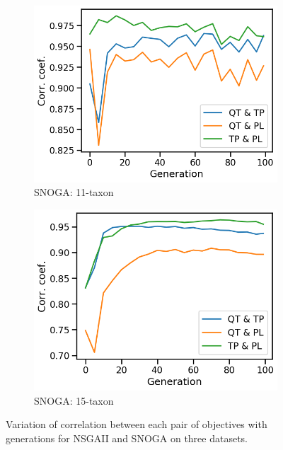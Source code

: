 \begin{figure}[!htbp]
\begin{adjustwidth}{-1cm}{-1cm}
\begin{subfigure}[b]{0.4\textwidth}
			\includegraphics[width=\textwidth]{Figure/11-taxon_NOSSGA_corr_plot}
			\caption{SNOGA: 11-taxon}
		\end{subfigure}%
		\begin{subfigure}[b]{0.4\textwidth}
			\includegraphics[width=\textwidth]{Figure/15-taxon_NOSSGA_corr_plot}
			\caption{SNOGA: 15-taxon}
		\end{subfigure}
		\caption{Variation of correlation between each pair of objectives with generations for NSGAII and SNOGA on three datasets. 
		}
		\label{fig:gen_wise_correlation}
	\end{adjustwidth}
\end{figure}

